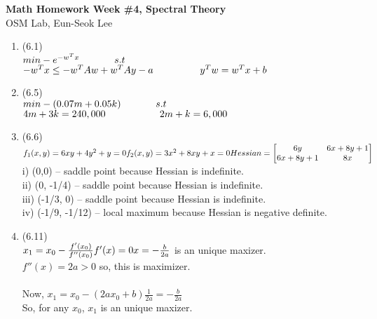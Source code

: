 \documentclass[letterpaper,12pt]{article}
\theoremstyle{definition}
\begin{document}
\begin{flushleft}
   \textbf{\large{Math Homework Week \#4, Spectral Theory}} \\[5pt]
   OSM Lab, Eun-Seok Lee \\[5pt]

\end{flushleft}

\vspace{5mm}

\begin{enumerate}



	\item (6.1) \\
$min -e^{-w^Tx} \\
\phantom{----}s.t$ $-w^Tx \leq - w^TAw + w^TAy - a\\
\phantom{-----}y^Tw = w^Tx +b$


	\item (6.5) \\
$min -(0.07m + 0.05k) \\
\phantom{----}s.t$ $4m + 3k = 240,000\\
\phantom{------}2m + k = 6,000$

	\item (6.6) \\
$f_1(x,y) = 6xy + 4y^2 + y = 0\\
f_2(x, y) = 3x^2 + 8xy + x = 0\\  \\
Hessian =  \begin{bmatrix} 6y& 6x+8y+1 \\ 6x+8y+1& 8x \end{bmatrix}\\$
i) (0,0) -- saddle point because Hessian is indefinite.\\
ii) (0, -1/4) -- saddle point because Hessian is indefinite.\\
iii) (-1/3, 0) -- saddle point because Hessian is indefinite.\\
iv) (-1/9, -1/12) -- local maximum because Hessian is negative definite.\\


	\item (6.11) \\
$ x_1 = x_0 - \frac{f'(x_0)}{f''(x_0)}\\
f'(x) = 0\\
x = -\frac{b}{2a} $ is an unique maxizer. \\
$f''(x) = 2a > 0$ so, this is maximizer. \\
\\
Now, $x_1 = x_0 - (2ax_0 +b)\frac{1}{2a} = -\frac{b}{2a}$ \\
So, for any $x_0$, $x_1$ is an unique maxizer.
 



\end{enumerate}
\end{document}
